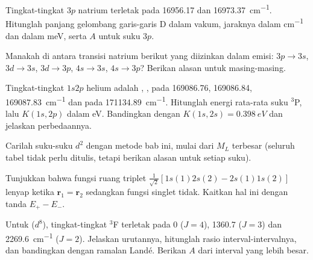 \begin{exercise}[$\star\star$]\label{exo:b3:many-electron-atoms:6}
Tingkat-tingkat $3p$ natrium terletak pada 16956.17 dan \qty{16973.37}{cm^{-1}}.
Hitunglah panjang gelombang garis-garis D dalam vakum, jaraknya dalam
\unit{cm^{-1}} dan dalam meV, serta $A$ untuk suku $3p$.
\end{exercise}

\begin{exercise}[$\star\star$]\label{exo:b3:many-electron-atoms:7}
Manakah di antara transisi natrium berikut yang diizinkan dalam emisi:
$3p \to 3s$, $3d \to 3s$, $3d \to 3p$, $4s \to 3s$, $4s \to 3p$? Berikan
alasan untuk masing-masing.
\end{exercise}

\begin{exercise}[$\star\star$]\label{exo:b3:many-electron-atoms:8}
Tingkat-tingkat $1s2p$ helium adalah , ,
 pada 169086.76, 169086.84, \qty{169087.83}{cm^{-1}} dan
 pada \qty{171134.89}{cm^{-1}}. Hitunglah energi rata-rata
suku ${}^3$P, lalu $K(1s,2p)$ dalam eV. Bandingkan dengan $K(1s,2s) = \qty{0.398}{eV}$ dan jelaskan perbedaannya.
\end{exercise}

\begin{exercise}[$\star\star$]\label{exo:b3:many-electron-atoms:9}
Carilah suku-suku $d^2$ dengan metode bab ini, mulai dari $M_L$ terbesar
(seluruh tabel tidak perlu ditulis, tetapi berikan alasan untuk setiap suku).
\end{exercise}

\begin{exercise}[$\star\star\star$]\label{exo:b3:many-electron-atoms:10}
Tunjukkan bahwa fungsi ruang triplet $\frac{1}{\sqrt2}[1s(1)2s(2) -
2s(1)1s(2)]$ lenyap ketika $\mathbf r_1 = \mathbf r_2$ sedangkan fungsi singlet
tidak. Kaitkan hal ini dengan tanda $E_+ - E_-$.
\end{exercise}

\begin{exercise}[$\star\star\star$]\label{exo:b3:many-electron-atoms:11}
Untuk  ($d^8$), tingkat-tingkat ${}^3$F terletak pada 0 ($J = 4$),
1360.7 ($J = 3$) dan \qty{2269.6}{cm^{-1}} ($J = 2$). Jelaskan urutannya,
hitunglah rasio interval-intervalnya, dan bandingkan dengan ramalan Landé.
Berikan $A$ dari interval yang lebih besar.
\end{exercise}

